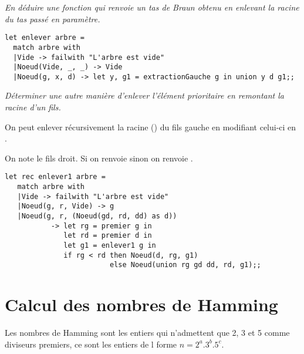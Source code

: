 \begin{Exercise}[title = Enlever la racine]\it 
En déduire une fonction  qui renvoie un tas de Braun obtenu en enlevant la racine du tas passé en paramètre.
\end{Exercise}
\begin{Answer}
\begin{lstlisting}
let enlever arbre = 
  match arbre with
  |Vide -> failwith "L'arbre est vide"
  |Noeud(Vide, _, _) -> Vide
  |Noeud(g, x, d) -> let y, g1 = extractionGauche g in union y d g1;;
\end{lstlisting}
\end{Answer}
\begin{Exercise}[title = Question facultative]\it 
Déterminer une autre manière d'enlever l'élément prioritaire en remontant la racine d'un fils.
\end{Exercise}
\begin{Answer} On peut enlever récursivement la racine () du fils gauche en modifiant celui-ci en . 

On note  le fils droit. 
Si  on renvoie  sinon on renvoie .
\begin{lstlisting}
let rec enlever1 arbre = 
   match arbre with
   |Vide -> failwith "L'arbre est vide"
   |Noeud(g, r, Vide) -> g
   |Noeud(g, r, (Noeud(gd, rd, dd) as d))
           -> let rg = premier g in
              let rd = premier d in                                     
              let g1 = enlever1 g in 
              if rg < rd then Noeud(d, rg, g1)
                         else Noeud(union rg gd dd, rd, g1);;
\end{lstlisting}
\end{Answer}
\section{Calcul des nombres de {\sc Hamming}}
Les nombres de {\sc Hamming} sont les entiers qui n'admettent que 2, 3 et 5 comme diviseurs premiers, ce sont les entiers de l forme $n = 2^a.3^b.5^c$.


